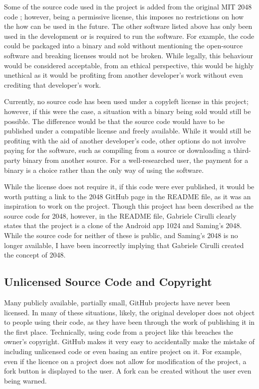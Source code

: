 \documentclass{article}
\begin{document}
Some of the source code used in the project is added from the original MIT 2048 code \cite{game2048}; however, being a permissive license, this imposes no restrictions on how the how can be used in the future. The other software listed above has only been used in the development or is required to run the software. For example, the code could be packaged into a binary and sold without mentioning the open-source software and  breaking licenses would not be broken. While legally, this behaviour would be considered acceptable, from an ethical perspective, this would be highly unethical as it would be profiting from another developer's work without even crediting that developer's work.

Currently, no source code has been used under a copyleft license in this project; however, if this were the case, a situation with a binary being sold would still be possible. The difference would be that the source code would have to be published under a compatible license and freely available. While it would still be profiting with the aid of another developer's code, other options do not involve paying for the software, such as compiling from a source or downloading a third-party binary from another source. For a well-researched user, the payment for a binary is a choice rather than the only way of using the software.

While the license does not require it, if this code were ever published, it would be worth putting a link to the 2048 GitHub page \cite{game2048} in the README file, as it was an inspiration to work on the project. Though this project \cite{game2048} has been described as the source code for 2048, however, in the README file, Gabriele Cirulli clearly states that the project is a clone of the Android app 1024 and Saming's 2048. While the source code for neither of these is public, and Saming's 2048 is no longer available, I have been incorrectly implying that Gabriele Cirulli created the concept of 2048.

\subsection{Unlicensed Source Code and Copyright}
Many publicly available, partially small, GitHub projects have never been licensed. In many of these situations, likely, the original developer does not object to people using their code, as they have been through the work of publishing it in the first place. Technically, using code from a project like this breaches the owner's copyright. GitHub makes it very easy to accidentally make the mistake of including unlicensed code or even basing an entire project on it. For example, even if the licence on a project does not allow for modification of the project, a fork button is displayed to the user. A fork can be created without the user even being warned.
\end{document}
